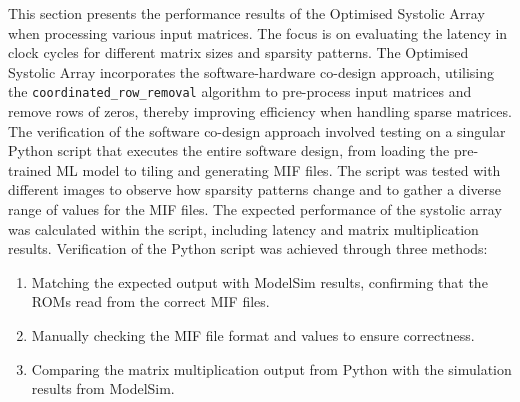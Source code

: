 \documentclass[12pt, a4paper, ukenglish]{article}
\begin{document}

    

    This section presents the performance results of the Optimised Systolic Array when processing various input matrices. The focus is on evaluating the latency in clock cycles for different matrix sizes and sparsity patterns. The Optimised Systolic Array incorporates the software-hardware co-design approach, utilising the \texttt{coordinated\_row\_removal} algorithm to pre-process input matrices and remove rows of zeros, thereby improving efficiency when handling sparse matrices.
    \newline
    The verification of the software co-design approach involved testing on a singular Python script that executes the entire software design, from loading the pre-trained ML model to tiling and generating MIF files. The script was tested with different images to observe how sparsity patterns change and to gather a diverse range of values for the MIF files. The expected performance of the systolic array was calculated within the script, including latency and matrix multiplication results. Verification of the Python script was achieved through three methods: 
    \begin{enumerate}
        \item Matching the expected output with ModelSim results, confirming that the ROMs read from the correct MIF files.
        \item Manually checking the MIF file format and values to ensure correctness.
        \item Comparing the matrix multiplication output from Python with the simulation results from ModelSim.
    \end{enumerate}
\end{document}
